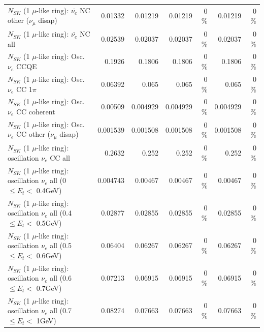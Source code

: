 \begin{table}
\begin{tabular}{| l | r | r | r  r | r  r |}
          $N_{SK}$ (1 $\mu$-like ring): $\bar{\nu_e}$ NC other ($\nu_\mu$ disap) &         0.01332 &         0.01219 &         0.01219 &        0 \%  &         0.01219 &        0 \%  \\ 
                            $N_{SK}$ (1 $\mu$-like ring): $\bar{\nu_{e}}$ NC all &         0.02539 &         0.02037 &         0.02037 &        0 \%  &         0.02037 &        0 \%  \\ 
\hline
\hline
\hline
                                 $N_{SK}$ (1 $\mu$-like ring): Osc. $\nu_e$ CCQE &          0.1926 &          0.1806 &          0.1806 &        0 \%  &          0.1806 &        0 \%  \\ 
                            $N_{SK}$ (1 $\mu$-like ring): Osc. $\nu_e$ CC 1$\pi$ &         0.06392 &           0.065 &           0.065 &        0 \%  &           0.065 &        0 \%  \\ 
                          $N_{SK}$ (1 $\mu$-like ring): Osc. $\nu_e$ CC coherent &         0.00509 &        0.004929 &        0.004929 &        0 \%  &        0.004929 &        0 \%  \\ 
           $N_{SK}$ (1 $\mu$-like ring): Osc. $\nu_e$ CC other ($\nu_\mu$ disap) &        0.001539 &        0.001508 &        0.001508 &        0 \%  &        0.001508 &        0 \%  \\ 
                        $N_{SK}$ (1 $\mu$-like ring): oscillation $\nu_e$ CC all &          0.2632 &           0.252 &           0.252 &        0 \%  &           0.252 &        0 \%  \\ 
\hline
$N_{SK}$ (1 $\mu$-like ring): oscillation $\nu_{e}$ all (0 $\leq E_{t} <$ 0.4GeV) &        0.004743 &         0.00467 &         0.00467 &        0 \%  &         0.00467 &        0 \%  \\ 
$N_{SK}$ (1 $\mu$-like ring): oscillation $\nu_{e}$ all (0.4 $\leq E_{t} <$ 0.5GeV) &         0.02877 &         0.02855 &         0.02855 &        0 \%  &         0.02855 &        0 \%  \\ 
$N_{SK}$ (1 $\mu$-like ring): oscillation $\nu_{e}$ all (0.5 $\leq E_{t} <$ 0.6GeV) &         0.06404 &         0.06267 &         0.06267 &        0 \%  &         0.06267 &        0 \%  \\ 
$N_{SK}$ (1 $\mu$-like ring): oscillation $\nu_{e}$ all (0.6 $\leq E_{t} <$ 0.7GeV) &         0.07213 &         0.06915 &         0.06915 &        0 \%  &         0.06915 &        0 \%  \\ 
$N_{SK}$ (1 $\mu$-like ring): oscillation $\nu_{e}$ all (0.7 $\leq E_{t} <$ 1GeV) &         0.08274 &         0.07663 &         0.07663 &        0 \%  &         0.07663 &        0 \%  \\ 

\end{tabular}
\end{table}
